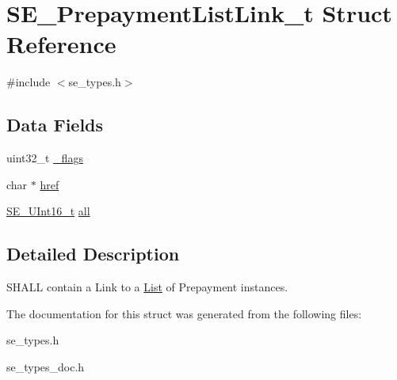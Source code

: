 \hypertarget{structSE__PrepaymentListLink__t}{}\section{S\+E\+\_\+\+Prepayment\+List\+Link\+\_\+t Struct Reference}
\label{structSE__PrepaymentListLink__t}


{\ttfamily \#include $<$se\+\_\+types.\+h$>$}

\subsection*{Data Fields}
\begin{DoxyCompactItemize}
\item 
uint32\+\_\+t \hyperlink{group__PrepaymentListLink_ga261f83524411826f6b3447e29723d0e1}{\+\_\+flags}
\item 
char $\ast$ \hyperlink{group__PrepaymentListLink_gaa4762fcd0cb0e237cc9087b4bafef73d}{href}
\item 
\hyperlink{group__UInt16_gac68d541f189538bfd30cfaa712d20d29}{S\+E\+\_\+\+U\+Int16\+\_\+t} \hyperlink{group__PrepaymentListLink_ga7f7296815f5a0d80f024c5ae2d1561ce}{all}
\end{DoxyCompactItemize}


\subsection{Detailed Description}
S\+H\+A\+LL contain a Link to a \hyperlink{structList}{List} of Prepayment instances. 

The documentation for this struct was generated from the following files\+:\begin{DoxyCompactItemize}
\item 
se\+\_\+types.\+h\item 
se\+\_\+types\+\_\+doc.\+h\end{DoxyCompactItemize}
